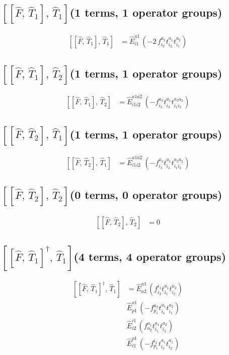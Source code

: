 \documentclass[11pt]{article}
\begin{document}
\subsection*{$\left[\left[\hat{F},\, \hat{T}_{1}\right],\, \hat{T}_{1}\right]$\quad(1 terms, 1 operator groups)}
\begin{align}
\left[\left[\hat{F},\, \hat{T}_{1}\right],\, \hat{T}_{1}\right] &= \hat{E}^{a1}_{i1}\,\left(- 2\, f^{a_{2}}_{i_{2}} t^{a_{1}}_{i_{2}} t^{a_{2}}_{i_{1}} \right)
\end{align}
\subsection*{$\left[\left[\hat{F},\, \hat{T}_{1}\right],\, \hat{T}_{2}\right]$\quad(1 terms, 1 operator groups)}
\begin{align}
\left[\left[\hat{F},\, \hat{T}_{1}\right],\, \hat{T}_{2}\right] &= \hat{E}^{a1a2}_{i1i2}\,\left(- f^{a_{3}}_{i_{3}} t^{a_{1}}_{i_{3}} t^{a_{3}a_{2}}_{i_{1}i_{2}} \right)
\end{align}
\subsection*{$\left[\left[\hat{F},\, \hat{T}_{2}\right],\, \hat{T}_{1}\right]$\quad(1 terms, 1 operator groups)}
\begin{align}
\left[\left[\hat{F},\, \hat{T}_{2}\right],\, \hat{T}_{1}\right] &= \hat{E}^{a1a2}_{i1i2}\,\left(- f^{a_{3}}_{i_{3}} t^{a_{1}}_{i_{3}} t^{a_{3}a_{2}}_{i_{1}i_{2}} \right)
\end{align}
\subsection*{$\left[\left[\hat{F},\, \hat{T}_{2}\right],\, \hat{T}_{2}\right]$\quad(0 terms, 0 operator groups)}
\begin{align}
\left[\left[\hat{F},\, \hat{T}_{2}\right],\, \hat{T}_{2}\right] &= 0
\end{align}
\subsection*{$\left[\left[\hat{F},\, \hat{T}_{1}\right]^{\dagger},\, \hat{T}_{1}\right]$\quad(4 terms, 4 operator groups)}
\begin{align}
\left[\left[\hat{F},\, \hat{T}_{1}\right]^{\dagger},\, \hat{T}_{1}\right] &= \hat{E}^{a1}_{a2}\,\left(f^{i_{1}}_{i_{2}} t^{a_{1}}_{i_{1}} t^{a_{2}}_{i_{2}} \right) \\
&\hat{E}^{a1}_{p1}\,\left(- f^{a_{2}}_{p_{1}} t^{a_{1}}_{i_{1}} t^{a_{2}}_{i_{1}} \right) \\
&\hat{E}^{i1}_{i2}\,\left(f^{a_{1}}_{a_{2}} t^{a_{1}}_{i_{1}} t^{a_{2}}_{i_{2}} \right) \\
&\hat{E}^{p1}_{i1}\,\left(- f^{i_{2}}_{p_{1}} t^{a_{1}}_{i_{1}} t^{a_{1}}_{i_{2}} \right)
\end{align}
\end{document}
